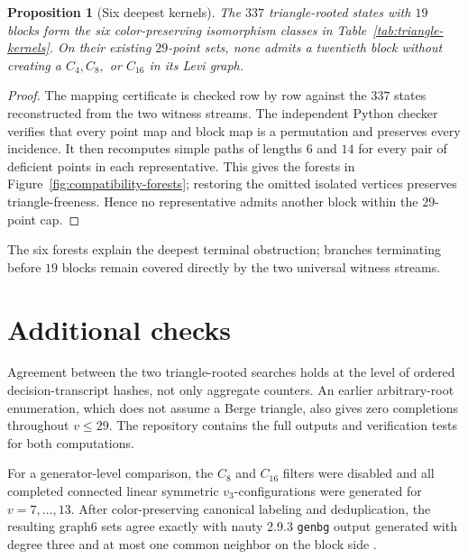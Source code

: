 \documentclass[11pt]{article}
\newtheorem{proposition}[theorem]{Proposition}
\theoremstyle{definition}
\newcommand{\code}[1]{\texttt{#1}}
\begin{document}
\begin{proposition}[Six deepest kernels]\label{prop:triangle-kernels}
The \(337\) triangle-rooted states with \(19\) blocks form the six
color-preserving isomorphism classes in
Table~\ref{tab:triangle-kernels}. On their existing \(29\)-point sets, none
admits a twentieth block without creating a \(C_4,C_8,\) or \(C_{16}\) in
its Levi graph.
\end{proposition}

\begin{proof}
The mapping certificate is checked row by row against the \(337\)
states reconstructed from the two witness streams. The independent Python
checker verifies that every point map and block map is a permutation and
preserves every incidence. It then recomputes simple paths of lengths
\(6\) and \(14\) for every pair of deficient points in each representative.
This gives the forests in Figure~\ref{fig:compatibility-forests}; restoring
the omitted isolated vertices preserves triangle-freeness. Hence no
representative admits another block within the \(29\)-point cap.
\end{proof}

The six forests explain the deepest terminal obstruction; branches terminating
before \(19\) blocks remain covered directly by the two universal witness
streams.

\section{Additional checks}\label{sec:crosschecks}

Agreement between the two triangle-rooted searches holds at the level of
ordered decision-transcript hashes, not only aggregate counters. An earlier
arbitrary-root enumeration, which does not assume a Berge triangle, also
gives zero completions throughout \(v\leq29\). The repository contains the
full outputs and verification tests for both computations.

For a generator-level comparison, the \(C_8\) and \(C_{16}\) filters were
disabled and all completed connected linear symmetric
\(v_3\)-configurations were generated for \(v=7,\ldots,13\). After
color-preserving canonical labeling and deduplication, the resulting graph6
sets agree exactly with nauty 2.9.3 \code{genbg} output generated with degree
three and at most one common neighbor on the block side
\cite{McKayPiperno2014}.
\end{document}
